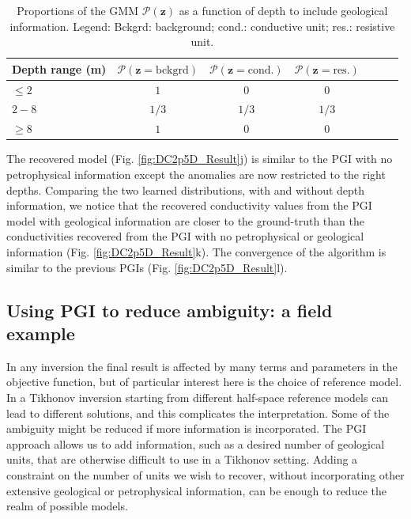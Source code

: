 \documentclass[extra]{gji} %
\begin{document}
\begin{table}
 \caption{Proportions of the GMM $\mathcal{P}(\mathbf{z})$ as a function of depth to include geological information. Legend: Bckgrd: background; cond.: conductive unit; res.: resistive unit.}
 \label{proportions_depth}
 \begin{tabular}{@{}lcccccc}
\hline
  Depth range (m) & $\mathcal{P}(\mathbf{z}=\text{bckgrd})$ & $\mathcal{P}(\mathbf{z}=\text{cond.})$ & $\mathcal{P}(\mathbf{z}=\text{res.})$ \\
\hline
  $\leq 2$ & $1$ & $0$ & $0$ \\
  $2-8$ & $1/3$ & $1/3$ & $1/3$ \\
  $\geq 8$ & $1$ & $0$ & $0$\\
\hline
 \end{tabular}
\end{table}

The recovered model (Fig. \ref{fig:DC2p5D_Result}j) is similar to the PGI with no petrophysical information except the anomalies are now restricted to the right depths. Comparing the two learned distributions, with and without depth information, we notice that the recovered conductivity values from the PGI model with geological information are closer to the ground-truth than the conductivities recovered from the PGI with no petrophysical or geological information (Fig. \ref{fig:DC2p5D_Result}k). The convergence of the algorithm is similar to the previous PGIs (Fig. \ref{fig:DC2p5D_Result}l).


\subsection{Using PGI to reduce ambiguity: a field example} \label{section:field_data}

In any inversion the final result is affected by many terms and parameters in the objective function, but of particular interest here is the choice of reference model. In a Tikhonov inversion starting from different half-space reference models can lead to different solutions, and this complicates the interpretation. Some of the ambiguity might be reduced if more information is incorporated. The PGI approach allows us to add information, such as a desired number of geological units, that are otherwise difficult to use in a Tikhonov setting. Adding a constraint on the number of units we wish to recover, without incorporating other extensive geological or petrophysical information, can be enough to reduce the realm of possible models.
\end{document}

